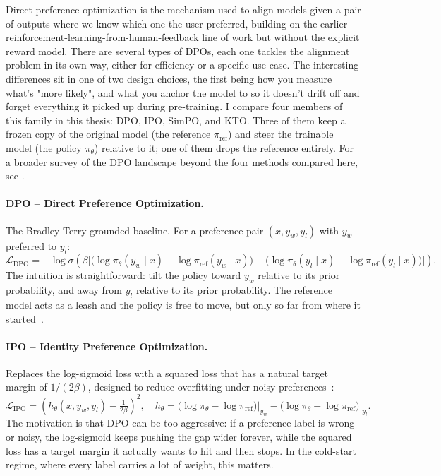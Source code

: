 Direct preference optimization is the mechanism used to align models given a pair of outputs where we know which one the user preferred, building on the earlier reinforcement-learning-from-human-feedback line of work \citep{christiano2017rlhf, ouyang2022instructgpt} but without the explicit reward model. There are several types of DPOs, each one tackles the alignment problem in its own way, either for efficiency or a specific use case. The interesting differences sit in one of two design choices, the first being how you measure what's "more likely", and what you anchor the model to so it doesn't drift off and forget everything it picked up during pre-training. I compare four members of this family in this thesis: DPO, IPO, SimPO, and KTO. Three of them keep a frozen copy of the original model (the reference $\pi_{\text{ref}}$) and steer the trainable model (the policy $\pi_\theta$) relative to it; one of them drops the reference entirely. For a broader survey of the DPO landscape beyond the four methods compared here, see \citet{xiao2024dposurvey}.

\paragraph{DPO -- Direct Preference Optimization.} The Bradley-Terry-grounded baseline. For a preference pair $(x, y_w, y_l)$ with $y_w$ preferred to $y_l$:
\begin{equation}
\mathcal{L}_{\text{DPO}} = -\log \sigma\!\left(\beta\Big[\big(\log \pi_\theta(y_w \mid x) - \log \pi_{\text{ref}}(y_w \mid x)\big) - \big(\log \pi_\theta(y_l \mid x) - \log \pi_{\text{ref}}(y_l \mid x)\big)\Big]\right).
\end{equation}
The intuition is straightforward: tilt the policy toward $y_w$ relative to its prior probability, and away from $y_l$ relative to its prior probability. The reference model acts as a leash and the policy is free to move, but only so far from where it started~\citep{rafailov2023dpo}.

\paragraph{IPO -- Identity Preference Optimization.} Replaces the log-sigmoid loss with a squared loss that has a natural target margin of $1/(2\beta)$, designed to reduce overfitting under noisy preferences~\citep{azar2024ipo}:
\begin{equation}
\mathcal{L}_{\text{IPO}} = \left(h_\theta(x, y_w, y_l) - \tfrac{1}{2\beta}\right)^2, \quad h_\theta = \big(\log \pi_\theta - \log \pi_{\text{ref}}\big)\Big|_{y_w} - \big(\log \pi_\theta - \log \pi_{\text{ref}}\big)\Big|_{y_l}.
\end{equation}
The motivation is that DPO can be too aggressive: if a preference label is wrong or noisy, the log-sigmoid keeps pushing the gap wider forever, while the squared loss has a target margin it actually wants to hit and then stops. In the cold-start regime, where every label carries a lot of weight, this matters.

